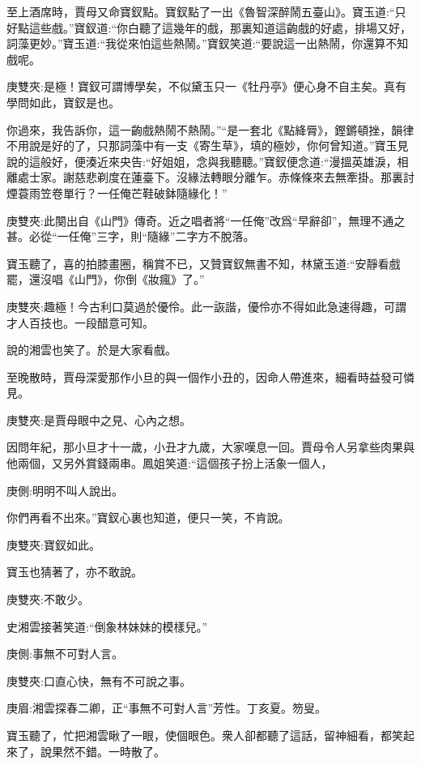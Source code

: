 \begin{parag}
    至上酒席時，賈母又命寶釵點。寶釵點了一出《魯智深醉鬧五臺山》。寶玉道:“只好點這些戲。”寶釵道:“你白聽了這幾年的戲，那裏知道這齣戲的好處，排場又好，詞藻更妙。”寶玉道:“我從來怕這些熱鬧。”寶釵笑道:“要說這一出熱鬧，你還算不知戲呢。\begin{note}庚雙夾:是極！寶釵可謂博學矣，不似黛玉只一《牡丹亭》便心身不自主矣。真有學問如此，寶釵是也。\end{note}你過來，我告訴你，這一齣戲熱鬧不熱鬧。”“是一套北《點絳脣》，鏗鏘頓挫，韻律不用說是好的了，只那詞藻中有一支《寄生草》，填的極妙，你何曾知道。”寶玉見說的這般好，便湊近來央告:“好姐姐，念與我聽聽。”寶釵便念道:“漫搵英雄淚，相離處士家。謝慈悲剃度在蓮臺下。沒緣法轉眼分離乍。赤條條來去無牽掛。那裏討煙蓑雨笠卷單行？一任俺芒鞋破鉢隨緣化！”\begin{note}庚雙夾:此闋出自《山門》傳奇。近之唱者將“一任俺”改爲“早辭卻”，無理不通之甚。必從“一任俺”三字，則“隨緣”二字方不脫落。\end{note}
\end{parag}


\begin{parag}
    寶玉聽了，喜的拍膝畫圈，稱賞不已，又贊寶釵無書不知，林黛玉道:“安靜看戲罷，還沒唱《山門》，你倒《妝瘋》了。”\begin{note}庚雙夾:趣極！今古利口莫過於優伶。此一詼諧，優伶亦不得如此急速得趣，可謂才人百技也。一段醋意可知。\end{note}說的湘雲也笑了。於是大家看戲。
\end{parag}


\begin{parag}
    至晚散時，賈母深愛那作小旦的與一個作小丑的，因命人帶進來，細看時益發可憐見。\begin{note}庚雙夾:是賈母眼中之見、心內之想。\end{note}因問年紀，那小旦才十一歲，小丑才九歲，大家嘆息一回。賈母令人另拿些肉果與他兩個，又另外賞錢兩串。鳳姐笑道:“這個孩子扮上活象一個人，\begin{note}庚側:明明不叫人說出。\end{note}你們再看不出來。”寶釵心裏也知道，便只一笑，不肯說。\begin{note}庚雙夾:寶釵如此。\end{note}寶玉也猜著了，亦不敢說。\begin{note}庚雙夾:不敢少。\end{note}史湘雲接著笑道:“倒象林妹妹的模樣兒。”\begin{note}庚側:事無不可對人言。\end{note}\begin{note}庚雙夾:口直心快，無有不可說之事。\end{note}\begin{note}庚眉:湘雲探春二卿，正“事無不可對人言”芳性。丁亥夏。笏叟。\end{note}寶玉聽了，忙把湘雲瞅了一眼，使個眼色。衆人卻都聽了這話，留神細看，都笑起來了，說果然不錯。一時散了。
\end{parag}


